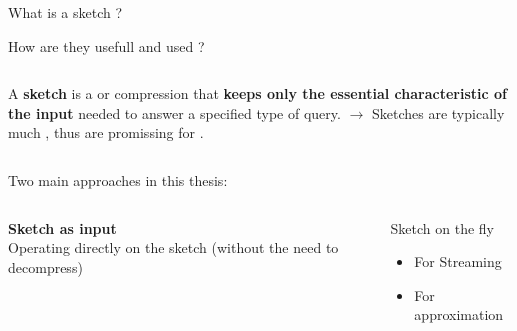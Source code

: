 \documentclass[aspectratio=169]{beamer}
\begin{document}
\begin{frame}{What is a sketch ?}
\end{frame}

\begin{frame}{How are they usefull and used ?}
    \begin{columns}
        \small{A \textbf{sketch} is a  or  compression that \textbf{keeps only the essential characteristic of the input} needed to answer a specified type of query.}
        \LARGE{$\rightarrow$}
            \small{
            Sketches are typically much , thus are promissing for .}
    \end{columns}
    \pause
    \bigskip
    \hspace{-0.5cm} {\large Two main approaches in this thesis:}
    \medskip
    \pause 
    \begin{columns}
        \begin{framed}
            \centering
            \textbf{Sketch as input}\\
            Operating directly on the sketch (without the need to decompress)
        \end{framed}
        \begin{framed}
            \centering
            Sketch on the fly
            \begin{itemize}
                \item For Streaming
                \item For approximation
            \end{itemize}
        \end{framed}
    \end{columns}

\end{frame}
\end{document}
